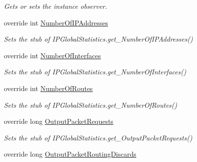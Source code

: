 \begin{DoxyCompactItemize}
\begin{DoxyCompactList}\small\item\em Gets or sets the instance observer.\end{DoxyCompactList}\item 
override int \hyperlink{class_system_1_1_net_1_1_network_information_1_1_fakes_1_1_stub_i_p_global_statistics_a761bce0f3ef2ea0e996f14e0036c48fe}{Number\-Of\-I\-P\-Addresses}
\begin{DoxyCompactList}\small\item\em Sets the stub of I\-P\-Global\-Statistics.\-get\-\_\-\-Number\-Of\-I\-P\-Addresses()\end{DoxyCompactList}\item 
override int \hyperlink{class_system_1_1_net_1_1_network_information_1_1_fakes_1_1_stub_i_p_global_statistics_aaf97366b162ce39237ac7d564fe61336}{Number\-Of\-Interfaces}
\begin{DoxyCompactList}\small\item\em Sets the stub of I\-P\-Global\-Statistics.\-get\-\_\-\-Number\-Of\-Interfaces()\end{DoxyCompactList}\item 
override int \hyperlink{class_system_1_1_net_1_1_network_information_1_1_fakes_1_1_stub_i_p_global_statistics_a5223fb758c69ca63382876a6f1b686b7}{Number\-Of\-Routes}
\begin{DoxyCompactList}\small\item\em Sets the stub of I\-P\-Global\-Statistics.\-get\-\_\-\-Number\-Of\-Routes()\end{DoxyCompactList}\item 
override long \hyperlink{class_system_1_1_net_1_1_network_information_1_1_fakes_1_1_stub_i_p_global_statistics_a0eb97d821875954c73c10cb68c966584}{Output\-Packet\-Requests}
\begin{DoxyCompactList}\small\item\em Sets the stub of I\-P\-Global\-Statistics.\-get\-\_\-\-Output\-Packet\-Requests()\end{DoxyCompactList}\item 
override long \hyperlink{class_system_1_1_net_1_1_network_information_1_1_fakes_1_1_stub_i_p_global_statistics_ac5377075392b31542bee1c85051f4dce}{Output\-Packet\-Routing\-Discards}

\end{DoxyCompactItemize}
